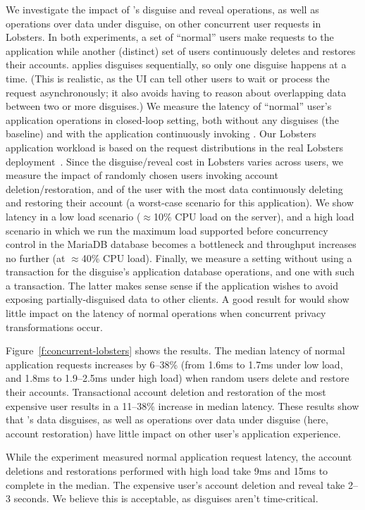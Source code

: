 %
We investigate the impact of \sys's disguise and reveal operations, as well as
operations over data under disguise, on other concurrent user requests in Lobsters.
%
In both experiments, a set of ``normal'' users make requests to the application
while another (distinct) set of users continuously deletes and restores their
accounts.
%
\sys applies disguises sequentially, so only one disguise happens at a time.
%
(This is realistic, as the UI can tell other users to wait or process the request
asynchronously; it also avoids \sys having to reason about overlapping data between
two or more disguises.)
%
We measure the latency of ``normal'' user's application operations in closed-loop
setting, both without any disguises (the baseline) and with the application
continuously invoking \sys.
%
Our Lobsters application workload is based on the request distributions in the real
Lobsters deployment~\cite{lobsters-data}.
%
Since the disguise/reveal cost in Lobsters varies across users, we measure the
impact of randomly chosen users invoking account deletion/restoration, and of
the user with the most data continuously deleting and restoring their account
(a worst-case scenario for this application).
%
We show latency in a low load scenario ($\approx$10\% CPU load on the server),
and a high load scenario in which we run the maximum load supported before
concurrency control in the MariaDB database becomes a bottleneck
and throughput increases no further (at $\approx$40\% CPU load).
%
Finally, we measure a setting without using a transaction for the disguise's
application database operations, and one with such a transaction.
%
The latter makes sense sense if the application wishes to avoid exposing
partially-disguised data to other clients.
%
A good result for \sys would show little impact on the latency of normal operations
when concurrent privacy transformations occur.
%

%
Figure~\ref{f:concurrent-lobsters} shows the results.
%
The median latency of normal application requests increases by 6--38\% (from
1.6ms to 1.7ms under low load, and 1.8ms to 1.9--2.5ms under high load) when
random users delete and restore their accounts.
%
Transactional account deletion and restoration of the most expensive user
results in a 11--38\% increase in median latency.
%
These results show that \sys's data disguises, as well as operations over data under disguise (here,
account restoration) have little impact on other user's application experience.
%

%
While the experiment measured normal application request latency, the
account deletions and restorations performed with high load take 9ms and
15ms to complete in the median.
%
The expensive user's account deletion and reveal take 2--3 seconds.
%
We believe this is acceptable, as disguises aren't time-critical.
%
